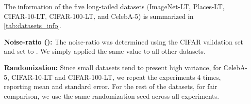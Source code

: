 \documentclass[nohyperref]{article}
\theoremstyle{plain}
\theoremstyle{definition}
\theoremstyle{remark}
\begin{document}
The information of the five long-tailed datasets (ImageNet-LT, Places-LT, CIFAR-10-LT, \mbox{CIFAR-100-LT}, and CelebA-5) is summarized in \cref{tab:datasets_info}.

\textbf{Noise-ratio ():} The noise-ratio  was determined using the CIFAR validation set and set to . We simply applied the same value to all other datasets.

\textbf{Randomization:} Since small datasets tend to present high variance, for CelebA-5, CIFAR-10-LT and CIFAR-100-LT, we repeat the experiments 4 times, reporting mean and standard error. For the rest of the datasets, for fair comparison, we use the same randomization seed across all experiments.

\begin{table*}
    \centering
    \vspace*{-0.2cm}
    \caption{\textbf{Long-tailed datasets.} {\it Summary of the long-tailed datasets we used for evaluation. 
    (see Sec.~\ref{sec:experiments} below for a detailed explanation).}}
    \label{tab:datasets_info}
\end{table*} 
\end{document}
